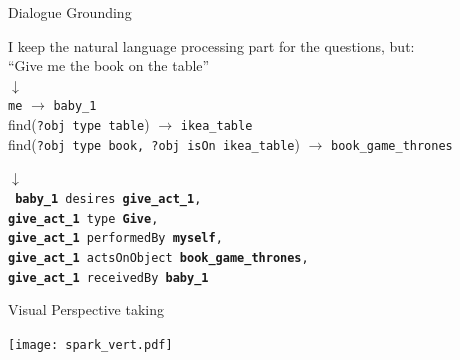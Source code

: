 \documentclass[handout,compress]{beamer}
\begin{document}
\begin{frame}{Dialogue Grounding}
    \centering

    I keep the natural language processing part for the questions, but:\\

    \vspace*{2em}
    ``Give me the book on the table''\\

     {
        $\downarrow$\\
        {\tt me} $\rightarrow$ {\tt baby\_1} \\
        find({\tt\scriptsize ?obj type table}) $\rightarrow$ {\tt ikea\_table} \\
        find({\tt\scriptsize ?obj type book, ?obj isOn ikea\_table})
        $\rightarrow$ {\tt book\_game\_thrones} \\
    }

     {
        $\downarrow$\\
        { \tt
            \textbf{baby\_1} desires \textbf{give\_act\_1}, \\
            \textbf{give\_act\_1} type \textbf{Give}, \\
            \textbf{give\_act\_1} performedBy \textbf{myself}, \\
            \textbf{give\_act\_1} actsOnObject \textbf{book\_game\_thrones}, \\
            \textbf{give\_act\_1} receivedBy \textbf{baby\_1} \\
        }
    }
\end{frame}




\begin{frame}{Visual Perspective taking}


        \centering
        \texttt{[image: spark\_vert.pdf]}

\end{frame}

\end{document}

